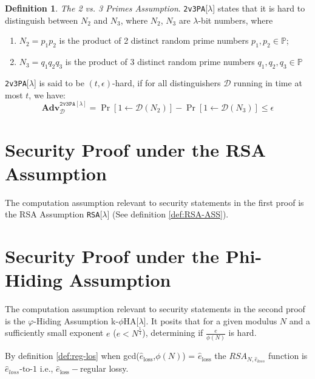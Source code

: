 \documentclass[]{final_report}
\theoremstyle{definition}
\newtheorem{definition}{Definition}[chapter]
\begin{document}
\begin{definition}
\textit{The 2 vs. 3 Primes Assumption}. \texttt{2v3PA}[$\lambda$] states that it is hard to distinguish between $N_2$ and $N_3$, where $N_2$, $N_3$ are $\lambda$-bit numbers, where 
\begin{enumerate}
\item $N_2 = p_1 p_2$ is the product of 2 distinct random prime numbers $p_1, p_2 \in \mathbb{P}$; 
\item $N_3 = q_1 q_2 q_3$ is the product of 3 distinct random prime numbers $q_1, q_2, q_3 \in \mathbb{P}$
\end{enumerate}
\texttt{2v3PA}[$\lambda$] is said to be $(t, \epsilon)$-hard, if for all distinguishers $\mathcal{D}$ running in time at most $t$, we have:
\[
\textbf{Adv}^{\texttt{2v3PA}[\lambda]}_\mathcal{D} = \Pr[1 \leftarrow \mathcal{D}(N_2)] - \Pr[1 \leftarrow \mathcal{D}(N_3)] \leqslant \epsilon
\]
\end{definition}

\section{Security Proof under the RSA Assumption}
The computation assumption relevant to security statements in the first proof is the RSA Assumption \texttt{RSA}[$\lambda$] (See definition \ref{def:RSA-ASS}).

\section{Security Proof under the Phi-Hiding Assumption}
The computation assumption relevant to security statements in the second proof is the $\varphi$-Hiding Assumption k-$\phi$HA[$\lambda$]. 
It posits that for a given modulus \( N \) and a sufficiently small exponent \( e \) (\( e < N^{\frac{1}{4}} \)), determining if \(\frac{e}{\phi(N)}\) is hard. 

By definition \ref{def:reg-los} when gcd(\( \hat{e}_{\text{loss}} \),\( \phi(N) \)) = \( \hat{e}_{\text{loss}} \) the $RSA_{N, \hat{e}_{loss}}$ function is \( \hat{e}_{loss}{\text{-to-}}1 \) i.e., \( \hat{e}_{\text{loss}}- \)regular lossy.
\end{document}
